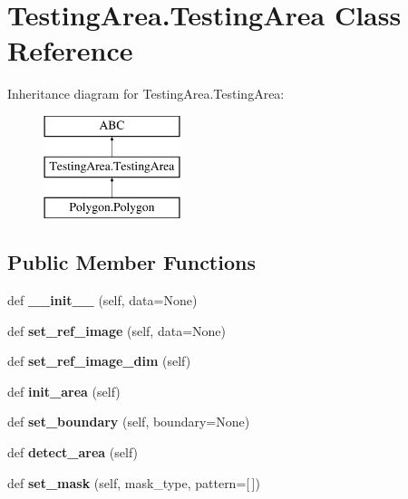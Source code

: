 \hypertarget{class_testing_area_1_1_testing_area}{}\section{Testing\+Area.\+Testing\+Area Class Reference}
\label{class_testing_area_1_1_testing_area}
Inheritance diagram for Testing\+Area.\+Testing\+Area\+:\begin{figure}[H]
\begin{center}
\leavevmode
\includegraphics[height=3.000000cm]{class_testing_area_1_1_testing_area}
\end{center}
\end{figure}
\subsection*{Public Member Functions}
\begin{DoxyCompactItemize}
\item 
\mbox{\label{class_testing_area_1_1_testing_area_ad5671c4eca8b890794412de1b1706867}} 
def {\bfseries \+\_\+\+\_\+init\+\_\+\+\_\+} (self, data=None)
\item 
\mbox{\label{class_testing_area_1_1_testing_area_ad26d423e3360754c6536d521ed65c45f}} 
def {\bfseries set\+\_\+ref\+\_\+image} (self, data=None)
\item 
\mbox{\label{class_testing_area_1_1_testing_area_a7075c80222e30aefd163e296c7074367}} 
def {\bfseries set\+\_\+ref\+\_\+image\+\_\+dim} (self)
\item 
\mbox{\label{class_testing_area_1_1_testing_area_a200699f4c8078c96e4764a1a8432fc56}} 
def {\bfseries init\+\_\+area} (self)
\item 
\mbox{\label{class_testing_area_1_1_testing_area_a08af51784df08dd4c27a4a46557600be}} 
def {\bfseries set\+\_\+boundary} (self, boundary=None)
\item 
\mbox{\label{class_testing_area_1_1_testing_area_af486411c73544ed862df200af45f7bf6}} 
def {\bfseries detect\+\_\+area} (self)
\item 
\mbox{\label{class_testing_area_1_1_testing_area_a23546a1f532ca97197628ac61ff512c1}} 
def {\bfseries set\+\_\+mask} (self, mask\+\_\+type, pattern=\mbox{[}$\,$\mbox{]})
\end{DoxyCompactItemize}
